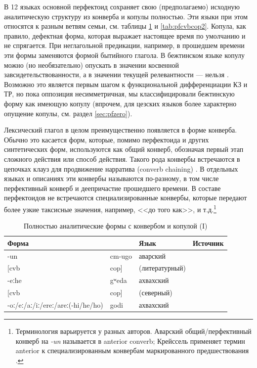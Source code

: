 В 12 языках основной перфектоид сохраняет свою (предполагаемо) исходную аналитическую структуру из конверба и копулы полностью. Эти языки при этом относятся к разным ветвям семьи, см. таблицы \ref{tab:pfcvbcop1} и \ref{tab:pfcvbcop2}. Копула, как правило, дефектная форма, которая выражает настоящее время по умолчанию и не спрягается. При неглагольной предикации, например, в прошедшем времени эти формы заменяются формой бытийного глагола. В бежтинском языке копулу можно (но необязательно) опускать в значении косвенной завсидетельствованности, а в значении текущей релевантности --- нельзя \citep[46]{khalilova2011}. Возможно это является первым шагом к функциональной дифференциации КЗ и ТР, но пока оппозиция несимметричная, мы классифицировали бежтинскую форму как имеющую копулу (впрочем, для цезских языков более характерно опущение копулы, см. раздел \ref{sec:pfzero}).
\par Лексический глагол в целом преимущественно появляется в форме конверба. Обычно это касается форм, которые, помимо перфектоида и других синтетических форм, используются как общий конверб, обозначая первый этап сложного действия или способ действия. Такого рода конвербы встречаются в цепочках клауз для продвижение нарратива (converb chaining) \citep{nedjalkov1995}. В отдельных языках и описаниях эти конвербы называются по-разному, в том числе перфективный конверб и деепричастие прошедшего времени. В составе перфектоидов не встречаются специализированные конвербы, которые передают более узкие таксисные значения, например, <<до того как>>, и т.д.\footnote{Терминология варьируется у разных авторов. Аварский общий/перфективный конверб на \textit{-un} называется в \citep{forker2018evidavar} anterior converb; Крейссель применяет термин anterior к специализированным конвербам маркированного предшествования \citep[127--128]{creissels2012}.}

\begin{table}[ht]
\caption{Полностью аналитические формы с конвербом и копулой (I)}
\label{tab:pfcvbcop1}
\vspace{0.2cm}
\begin{center}
\begin{tabular}{ll|ll}
\multicolumn{2}{l|}{Форма} & Язык      & Источник            \\ \hline
-un  	&	cm-ugo	&	аварский	&	\citep{mallaeva2007}	\\
{[}cvb	&	cop{]}	&	(литературный)	&		\\
-eːhe 	&	gʷeda 	&	ахвахский	&	\citep{magomedbekova1967}	\\
{[}cvb	&	cop{]}	&	(северный)	&		\\
-oː/eː/aː/iː/ereː/areː(-hi/he/ho)	&	godi	&	ахвахский	&	\citep{creissels2018}	\\
\end{tabular}
\end{center}
\end{table}

